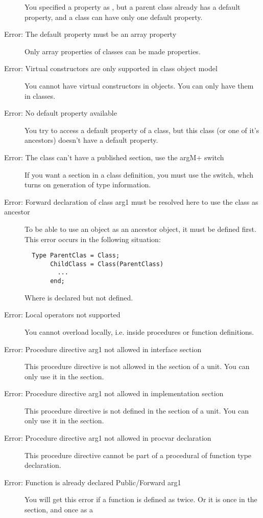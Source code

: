 \begin{description}
 You specified a property as , but a parent class already has a
 default property, and a class can have only one default property.
\item [Error: The default property must be an array property]
 Only array properties of classes can be made  properties. 
\item [Error: Virtual constructors are only supported in class object model]
 You cannot have virtual constructors in objects. You can only have them
 in classes.
\item [Error: No default property available]
 You try to access a default property of a class, but this class (or one of
 it's ancestors) doesn't have a default property.
\item [Error: The class can't have a published section, use the {argM+} switch]
 If you want a  section in a class definition, you must
 use the  switch, whch turns on generation of type
 information.
\item [Error: Forward declaration of class arg1 must be resolved here to use the class as ancestor]
 To be able to use an object as an ancestor object, it must be defined
 first. This error occurs in the following situation:
 \begin{verbatim}
  Type ParentClas = Class;
       ChildClass = Class(ParentClass)
         ...
       end;
 \end{verbatim}
 Where  is declared but not defined.
\item [Error: Local operators not supported]
 You cannot overload locally, i.e. inside procedures or function
 definitions.
\item [Error: Procedure directive arg1 not allowed in interface section]
 This procedure directive is not allowed in the  section of
 a unit. You can only use it in the  section.
\item [Error: Procedure directive arg1 not allowed in implementation section]
 This procedure directive is not defined in the  section of
 a unit. You can only use it in the  section.
\item [Error: Procedure directive arg1 not allowed in procvar declaration]
 This procedure directive cannot be part of a procedural of function
 type declaration.
\item [Error: Function is already declared Public/Forward arg1]
 You will get this error if a function is defined as  twice.
 Or it is once in the  section, and once as a  

\end{description}
